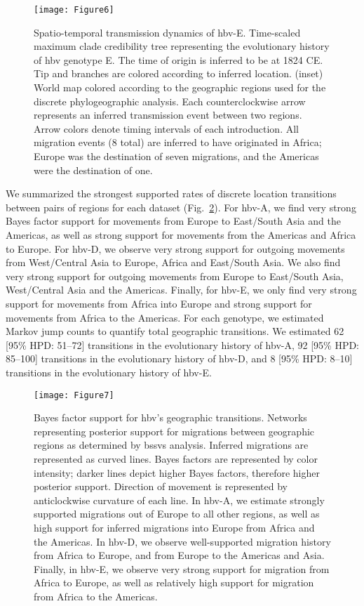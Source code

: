 \begin{figure}[ht]
  \centering
  \texttt{[image: Figure6]}
  \caption[HBV-E phylogeography]{Spatio-temporal transmission dynamics of \gls{hbv}-E. Time-scaled maximum clade credibility tree representing the evolutionary history of \gls{hbv} genotype E. The time of origin is inferred to be at 1824 CE. Tip and branches are colored  according to inferred location. (inset) World map colored according to the geographic regions used for the discrete phylogeographic analysis. Each counterclockwise arrow represents an inferred transmission event between two regions. Arrow colors denote timing intervals of each introduction. All migration events (8 total) are inferred to have originated in Africa; Europe was the destination of seven migrations, and the Americas were the destination of one.}
  \label{fig:3-6}
\end{figure}

We summarized the strongest supported rates of discrete location transitions between pairs of regions for each dataset (Fig.~\ref{fig:3-7}).
For \gls{hbv}-A, we find very strong Bayes factor support \citep{kass_bayes_1995} for movements from Europe to East/South Asia and the Americas, as well as strong support for movements from the Americas and Africa to Europe.
For \gls{hbv}-D, we observe very strong support for outgoing movements from West/Central Asia to Europe, Africa and East/South Asia.
We also find very strong support for outgoing movements from Europe to East/South Asia, West/Central Asia and the Americas.
Finally, for \gls{hbv}-E, we only find very strong support for movements from Africa into Europe and strong support for movements from Africa to the Americas.
For each genotype, we estimated Markov jump counts to quantify total geographic transitions.
We estimated 62 [95\% HPD: 51--72] transitions in the evolutionary history of \gls{hbv}-A, 92 [95\% HPD: 85--100] transitions in the evolutionary history of \gls{hbv}-D, and 8 [95\% HPD: 8--10] transitions in the evolutionary history of \gls{hbv}-E.

\begin{figure}[ht]
  \centering
  \texttt{[image: Figure7]}
  \caption[Bayes factor support for HBV migrations]{Bayes factor support for \gls{hbv}'s geographic transitions. Networks representing posterior support for migrations between geographic regions as determined by \gls{bssvs} analysis. Inferred migrations are represented as curved lines. Bayes factors are represented by color intensity; darker lines depict higher Bayes factors, therefore higher posterior support. Direction of movement is represented by anticlockwise curvature of each line. In \gls{hbv}-A, we estimate strongly supported migrations out of Europe to all other regions, as well as high support for inferred migrations into Europe from Africa and the Americas. In \gls{hbv}-D, we observe well-supported migration history from Africa to Europe, and from Europe to the Americas and Asia. Finally, in \gls{hbv}-E, we observe very strong support for migration from Africa to Europe, as well as relatively high support for migration from Africa to the Americas.}
  \label{fig:3-7}
\end{figure}

